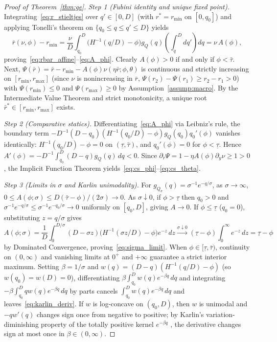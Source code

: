 \begin{proof}[Proof of Theorem~\ref{thm:ge}]
\emph{Step 1 (Fubini identity and unique fixed point).} Integrating~\eqref{eq:r_stieltjes} over $q' \in [0, D]$ (with $r^* = r_{\min}$ on $[0, q_0]$) and applying Tonelli's theorem on $\{q_0 \le q \le q' \le D\}$ yields
\[
\bar{r}(\nu, \phi) - r_{\min} = \frac{\nu}{D}\int_{q_0}^D \bigl(H^{-1}(q/D) - \phi\bigr)g_Q(q)\!\left(\int_q^D dq'\right)dq = \nu\,A(\phi),
\]
proving~\eqref{eq:rbar_affine}--\eqref{eq:A_phi}. Clearly $A(\phi) > 0$ if and only if $\phi < \bar{\tau}$. Next, $\Psi(\bar{r}) = \bar{r} - r_{\min} - A(\phi)\nu(\eta \bar{r}; \phi, \theta)$ is continuous and strictly increasing on $[r_{\min}, r_{\max}]$ (since $\nu$ is nonincreasing in $\bar{r}$, $\Psi(r_2) - \Psi(r_1) \ge r_2 - r_1 > 0$) with $\Psi(r_{\min}) \le 0$ and $\Psi(r_{\max}) \ge 0$ by Assumption~\ref{assump:macro}. By the Intermediate Value Theorem and strict monotonicity, a unique root $\bar{r}^* \in [r_{\min}, r_{\max}]$ exists.

\emph{Step 2 (Comparative statics).} Differentiating~\eqref{eq:A_phi} via Leibniz's rule, the boundary term $-D^{-1}(D - q_0)(H^{-1}(q_0/D) - \phi)g_Q(q_0)q_0'(\phi)$ vanishes identically: $H^{-1}(q_0/D) - \phi = 0$ on $(\underline{\tau}, \bar{\tau})$, and $q_0'(\phi) = 0$ for $\phi < \underline{\tau}$. Hence $A'(\phi) = -D^{-1}\int_{q_0}^D (D - q)g_Q(q)\,dq < 0$. Since $\partial_{\bar{r}}\Psi = 1 - \eta A(\phi)\partial_y \nu \ge 1 > 0$, the Implicit Function Theorem yields~\eqref{eq:cs_phi}--\eqref{eq:cs_theta}.

\emph{Step 3 (Limits in $\sigma$ and Karlin unimodality).} For $g_{Q_\sigma}(q) = \sigma^{-1}e^{-q/\sigma}$, as $\sigma \to \infty$, $0 \le A(\phi; \sigma) \le D(\bar{\tau} - \phi)/(2\sigma) \to 0$. As $\sigma \downarrow 0$, if $\phi > \underline{\tau}$ then $q_0 > 0$ and $\sigma^{-1}e^{-q/\sigma} \le \sigma^{-1}e^{-q_0/\sigma} \to 0$ uniformly on $[q_0, D]$, giving $A \to 0$. If $\phi \le \underline{\tau}$ ($q_0 = 0$), substituting $z = q/\sigma$ gives
\[
A(\phi; \sigma) = \frac{1}{D}\int_0^{D/\sigma} (D - \sigma z)\bigl(H^{-1}(\sigma z/D) - \phi\bigr)e^{-z}\,dz \xrightarrow{\sigma \downarrow 0} (\underline{\tau} - \phi)\int_0^\infty e^{-z}\,dz = \underline{\tau} - \phi
\]
by Dominated Convergence, proving~\eqref{eq:sigma_limit}. When $\phi \in [\underline{\tau}, \bar{\tau})$, continuity on $(0, \infty)$ and vanishing limits at $0^+$ and $+\infty$ guarantee a strict interior maximum. Setting $\beta = 1/\sigma$ and $w(q) = (D - q)(H^{-1}(q/D) - \phi)$ (so $w(q_0) = w(D) = 0$), differentiating $\beta\int_{q_0}^D w(q)e^{-\beta q}\,dq$ and integrating $-\beta\int_{q_0}^D q w(q)e^{-\beta q}\,dq$ by parts cancels $\int_{q_0}^D w(q)e^{-\beta q}\,dq$ and leaves~\eqref{eq:karlin_deriv}. If $w$ is log-concave on $(q_0, D)$, then $w$ is unimodal and $-q w'(q)$ changes sign once from negative to positive; by Karlin's variation-diminishing property of the totally positive kernel $e^{-\beta q}$ \citep{karlin1968total}, the derivative changes sign at most once in $\beta \in (0, \infty)$.
\end{proof}

